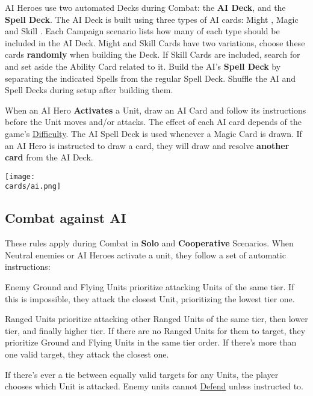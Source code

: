 \begin{multicols}{2}
AI Heroes use two automated Decks during Combat: the \textbf{AI Deck}, and the \textbf{Spell Deck}.
The AI Deck is built using three types of AI cards: Might , Magic  and Skill .
Each Campaign scenario lists how many of each type should be included in the AI Deck.
Might  and Skill  Cards have two variations, choose these cards \textbf{randomly} when building the Deck.
If Skill Cards are included, search for and set aside the Ability Card related to it.
Build the AI's \textbf{Spell Deck} by separating the indicated Spells from the regular Spell Deck.
Shuffle the AI and Spell Decks during setup after building them.\par
When an AI Hero \textbf{Activates} a Unit, draw an AI Card and follow its instructions before the Unit moves and/or attacks.
The effect of each AI card depends of the game's \hyperlink{Difficulty}{Difficulty}.
The AI Spell Deck is used whenever a Magic Card  is drawn.
If an AI Hero is instructed to draw a card, they will draw and resolve \textbf{another card} from the AI Deck.

\texttt{[image: \\cards/ai.png]}

\subsection*{\hypertarget{AI Combat}{Combat against AI}}

These rules apply during Combat in \textbf{Solo} and \textbf{Cooperative} Scenarios.
When Neutral enemies or AI Heroes activate a unit, they follow a set of automatic instructions:\par

Enemy Ground  and Flying  Units prioritize attacking Units of the same tier.
If this is impossible, they attack the closest Unit, prioritizing the lowest tier one.\par
Ranged  Units prioritize attacking other Ranged  Units of the same tier, then lower tier, and finally higher tier.
If there are no Ranged  Units for them to target, they prioritize Ground  and Flying  Units in the same tier order.
If there's more than one valid target, they attack the closest one.\par
If there's ever a tie between equally valid targets for any Units, the player chooses which Unit is attacked.
Enemy units cannot \hyperlink{Defend}{Defend} unless instructed to.


\end{multicols}
